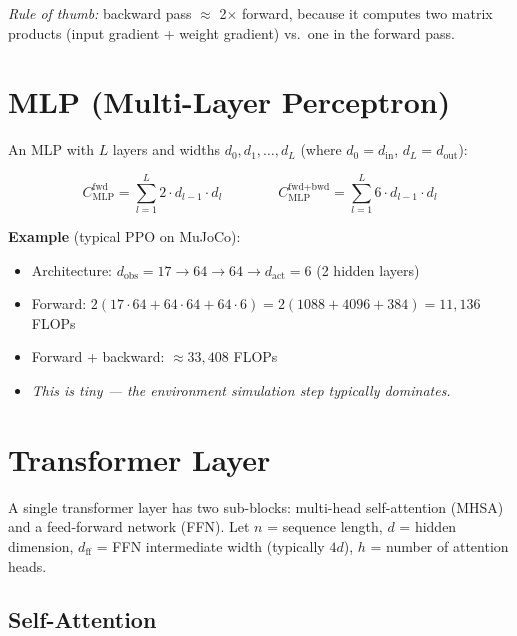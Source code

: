 \documentclass[11pt]{article}
\begin{document}
\textit{Rule of thumb:} backward pass $\approx$ 2$\times$ forward, because it computes two matrix products (input gradient + weight gradient) vs.\ one in the forward pass.

\section{MLP (Multi-Layer Perceptron)}

An MLP with $L$ layers and widths $d_0, d_1, \ldots, d_L$ (where $d_0 = d_{\text{in}}$, $d_L = d_{\text{out}}$):

\[
C_{\text{MLP}}^{\text{fwd}} = \sum_{l=1}^{L} 2 \cdot d_{l-1} \cdot d_l
\qquad\qquad
C_{\text{MLP}}^{\text{fwd+bwd}} = \sum_{l=1}^{L} 6 \cdot d_{l-1} \cdot d_l
\]

\textbf{Example} (typical PPO on MuJoCo):
\begin{itemize}[nosep]
\item Architecture: $d_{\text{obs}}=17 \to 64 \to 64 \to d_{\text{act}}=6$ (2 hidden layers)
\item Forward: $2(17 \!\cdot\! 64 + 64 \!\cdot\! 64 + 64 \!\cdot\! 6) = 2(1088 + 4096 + 384) = 11{,}136$ FLOPs
\item Forward + backward: $\approx 33{,}408$ FLOPs
\item \textit{This is tiny --- the environment simulation step typically dominates.}
\end{itemize}

\section{Transformer Layer}

A single transformer layer has two sub-blocks: multi-head self-attention (MHSA) and a feed-forward network (FFN).
Let $n$ = sequence length, $d$ = hidden dimension, $d_{\text{ff}}$ = FFN intermediate width (typically $4d$), $h$ = number of attention heads.

\subsection{Self-Attention}
\end{document}
